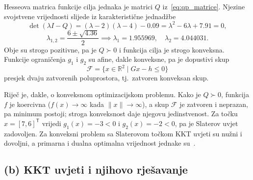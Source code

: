 Hesseova matrica funkcije cilja jednaka je matrici $Q$ iz~\eqref{eq:qp_matrice}. Njezine svojstvene vrijednosti slijede iz karakteristične jednadžbe
\begin{equation}
\det(\lambda I - Q) = (\lambda - 2)(\lambda - 4) - 0.09 = \lambda^2 - 6\lambda + 7.91 = 0,
\end{equation}
\begin{equation}
\lambda_{1,2} = \frac{6 \pm \sqrt{4.36}}{2} \implies \lambda_1 = 1.955969, \quad \lambda_2 = 4.044031.
\end{equation}
Obje su strogo pozitivne, pa je $Q \succ 0$ i funkcija cilja je strogo konveksna. Funkcije ograničenja $g_1$ i $g_2$ su afine, dakle konveksne, pa je dopustivi skup
\begin{equation}
\mathcal{F} = \{x \in \mathbb{R}^2 \mid Gx - h \leq 0\}
\end{equation}
presjek dvaju zatvorenih poluprostora, tj.\ zatvoren konveksan skup.

Riječ je, dakle, o konveksnom optimizacijskom problemu. Kako je $Q \succ 0$, funkcija $f$ je koercivna ($f(x) \to \infty$ kada $\|x\| \to \infty$), a skup $\mathcal{F}$ je zatvoren i neprazan, pa minimum postoji; stroga konveksnost daje njegovu jedinstvenost. Za točku $x = [7, 6]^{\mathsf{T}}$ vrijedi $g_1(x) = -3 < 0$ i $g_2(x) = -2 < 0$, pa je Slaterov uvjet zadovoljen. Za konveksni problem sa Slaterovom točkom KKT uvjeti su nužni i dovoljni, a primarna i dualna optimalna vrijednost jednake su~\cite[str.~16--17]{jokic2025dualnost}.

\subsection{(b) KKT uvjeti i njihovo rješavanje}

